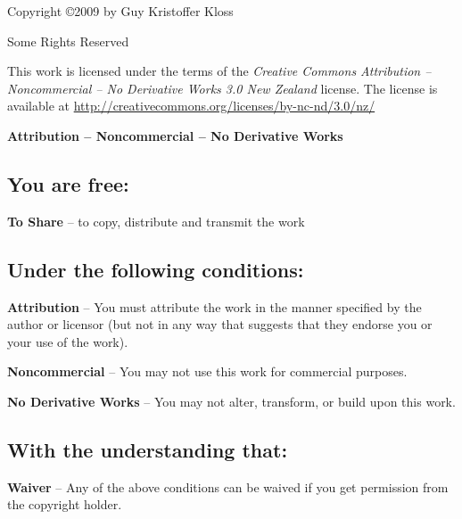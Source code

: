 \begin{center}
  \large{Copyright \copyright 2009 by Guy Kristoffer Kloss

  Some Rights Reserved}
\end{center}

This work is licensed under the terms of the \emph{Creative Commons
  Attribution -- Noncommercial -- No Derivative Works 3.0 New Zealand}
license.  The license is available at
\url{http://creativecommons.org/licenses/by-nc-nd/3.0/nz/}

\begin{center}

  \large{\textbf{Attribution -- Noncommercial -- No Derivative Works}}
\end{center}



\subsection*{You are free:}

\noindent
\textbf{To Share} -- to copy, distribute and transmit the work


\subsection*{Under the following conditions:}

\vspace{1em}
\noindent
\parbox{1.5cm}{}
\parbox{10.5cm}{\textbf{Attribution} -- You must attribute the work in
  the manner specified by the author or licensor (but not in any way
  that suggests that they endorse you or your use of the work).}
      
\vspace{1em}
\noindent
\parbox{1.5cm}{}
\parbox{10.5cm}{\textbf{Noncommercial} -- You may not use this work for
  commercial purposes.}

\vspace{1em}
\noindent
\parbox{1.5cm}{}
\parbox{10.5cm}{\textbf{No Derivative Works} -- You may not alter,
  transform, or build upon this work.}


\subsection*{With the understanding that:}

\noindent
\textbf{Waiver} -- Any of the above conditions can be waived if you
get permission from the copyright holder.

